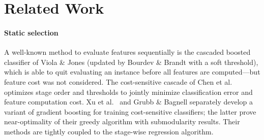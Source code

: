 \section{Related Work}


\paragraph{Static selection}%

A well-known method to evaluate features sequentially is the cascaded boosted classifier of Viola \& Jones \cite{Viola2004} (updated by Bourdev \& Brandt \cite{Bourdev-CVPR-2005} with a soft threshold), which is able to quit evaluating an instance before all features are computed---but feature cost was not considered.
The cost-sensitive cascade of Chen et al.\ \cite{Chen-AISTATS-2012} optimizes stage order and thresholds to jointly minimize classification error and feature computation cost.
Xu et al.\ \cite{Xu-ICML-2012} and Grubb \& Bagnell \cite{Grubb-AISTATS-2012} separately develop a variant of gradient boosting for training cost-sensitive classifiers; the latter prove near-optimality of their greedy algorithm with submodularity results.
Their methods are tightly coupled to the stage-wise regression algorithm.

